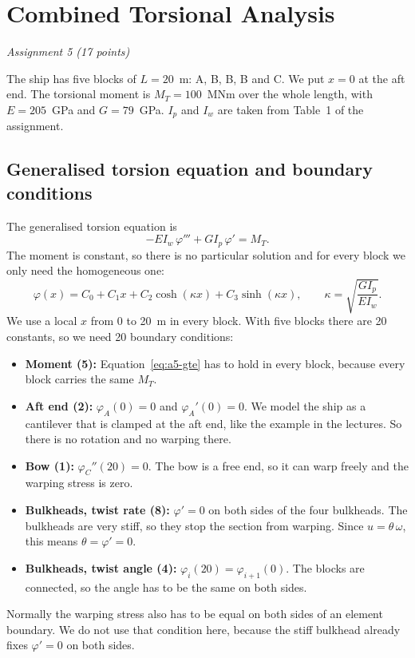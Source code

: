 \chapter{Combined Torsional Analysis}
\label{ch:assignment5}

\begingroup\itshape Assignment 5 (17 points)\endgroup

\bigskip

The ship has five blocks of $L = 20$~m: A, B, B, B and C. We put $x = 0$ at the aft end. The torsional moment is $M_T = 100$~MNm over the whole length, with $E = 205$~GPa and $G = 79$~GPa. $I_p$ and $I_w$ are taken from Table~1 of the assignment.

\section{Generalised torsion equation and boundary conditions}
\label{sec:a5-1}

The generalised torsion equation is
\begin{equation}
  -E I_w\,\varphi''' + G I_p\,\varphi' = M_T .
  \label{eq:a5-gte}
\end{equation}
The moment is constant, so there is no particular solution and for every block we only need the homogeneous one:
\begin{equation}
  \varphi(x) = C_0 + C_1 x + C_2\cosh(\kappa x) + C_3\sinh(\kappa x),
  \qquad \kappa = \sqrt{\frac{G I_p}{E I_w}} .
  \label{eq:a5-phi}
\end{equation}
We use a local $x$ from 0 to 20~m in every block. With five blocks there are 20 constants, so we need 20 boundary conditions:
\begin{itemize}
  \item \textbf{Moment (5):} Equation~\ref{eq:a5-gte} has to hold in every block, because every block carries the same $M_T$.
  \item \textbf{Aft end (2):} $\varphi_A(0) = 0$ and $\varphi_A'(0) = 0$. We model the ship as a cantilever that is clamped at the aft end, like the example in the lectures. So there is no rotation and no warping there.
  \item \textbf{Bow (1):} $\varphi_C''(20) = 0$. The bow is a free end, so it can warp freely and the warping stress is zero.
  \item \textbf{Bulkheads, twist rate (8):} $\varphi' = 0$ on both sides of the four bulkheads. The bulkheads are very stiff, so they stop the section from warping. Since $u = \theta\,\omega$, this means $\theta = \varphi' = 0$.
  \item \textbf{Bulkheads, twist angle (4):} $\varphi_i(20) = \varphi_{i+1}(0)$. The blocks are connected, so the angle has to be the same on both sides.
\end{itemize}
Normally the warping stress also has to be equal on both sides of an element boundary. We do not use that condition here, because the stiff bulkhead already fixes $\varphi' = 0$ on both sides.


